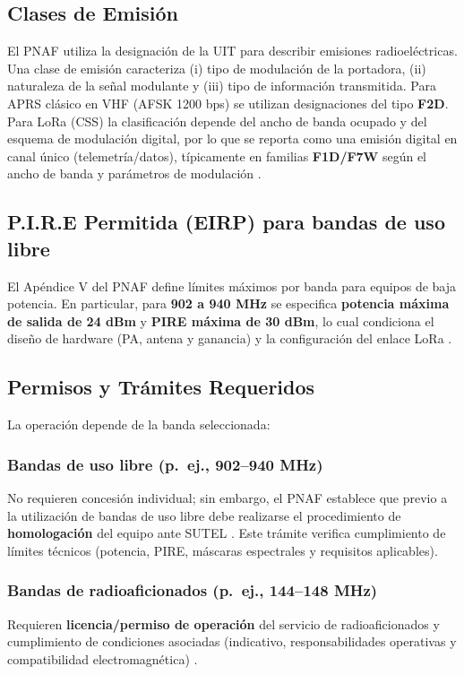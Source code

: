 \documentclass[conference]{IEEEtran}
\begin{document}
\subsection{Clases de Emisión}
El PNAF utiliza la designación de la UIT para describir emisiones radioeléctricas. Una clase de emisión caracteriza (i) tipo de modulación de la portadora, (ii) naturaleza de la señal modulante y (iii) tipo de información transmitida. Para APRS clásico en VHF (AFSK 1200 bps) se utilizan designaciones del tipo \textbf{F2D}. Para LoRa (CSS) la clasificación depende del ancho de banda ocupado y del esquema de modulación digital, por lo que se reporta como una emisión digital en canal único (telemetría/datos), típicamente en familias \textbf{F1D/F7W} según el ancho de banda y parámetros de modulación \cite{itu_emissions}.

\subsection{P.I.R.E Permitida (EIRP) para bandas de uso libre}
El Apéndice V del PNAF define límites máximos por banda para equipos de baja potencia. En particular, para \textbf{902 a 940 MHz} se especifica \textbf{potencia máxima de salida de 24 dBm} y \textbf{PIRE máxima de 30 dBm}, lo cual condiciona el diseño de hardware (PA, antena y ganancia) y la configuración del enlace LoRa \cite{pnaf_2023_micitt}.

\subsection{Permisos y Trámites Requeridos}
La operación depende de la banda seleccionada:

\subsubsection{Bandas de uso libre (p.\ ej., 902--940 MHz)}
No requieren concesión individual; sin embargo, el PNAF establece que previo a la utilización de bandas de uso libre debe realizarse el procedimiento de \textbf{homologación} del equipo ante SUTEL \cite{pnaf_2023_micitt,sutel_homologacion_2018}. Este trámite verifica cumplimiento de límites técnicos (potencia, PIRE, máscaras espectrales y requisitos aplicables).

\subsubsection{Bandas de radioaficionados (p.\ ej., 144--148 MHz)}
Requieren \textbf{licencia/permiso de operación} del servicio de radioaficionados y cumplimiento de condiciones asociadas (indicativo, responsabilidades operativas y compatibilidad electromagnética) \cite{pnaf_2023_micitt,sutel_radioaficionados}.
\end{document}
